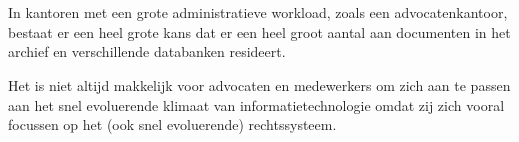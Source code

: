 
%
%
%
%
%

%



\chapter*{}

In kantoren met een grote administratieve workload, zoals een advocatenkantoor, bestaat er een heel grote kans dat er een heel groot aantal aan documenten 
in het archief en verschillende databanken resideert. 

Het is niet altijd makkelijk voor advocaten en medewerkers om zich aan te passen aan het snel evoluerende klimaat van informatietechnologie omdat zij zich vooral 
focussen op het (ook snel evoluerende) rechtssysteem.


